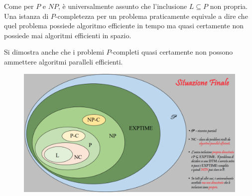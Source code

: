 Come per $P$ e $NP$, è universalmente assunto che l'inclusione $L \subseteq P$ non propria. Una istanza di $P$-completezza per un problema praticamente equivale a dire che quel problema possiede algoritmo efficiente in tempo ma quasi certamente non possiede mai algoritmi efficienti in spazio.

Si dimostra anche che i problemi $P$-completi quasi certamente non possono ammettere algoritmi paralleli efficienti. \vspace{2cm}

\begin{figure}[H]
  \centering
  \includegraphics[width=1\textwidth]{img/finale}
\end{figure}

